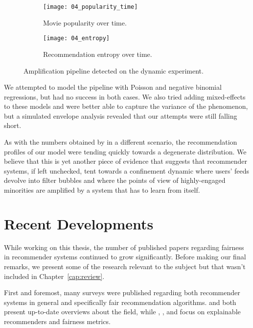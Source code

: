 \begin{figure}
  \centering
  \begin{subfigure}{0.45\textwidth}
    \centering
    \texttt{[image: 04\_popularity\_time]}
    \caption{Movie popularity over time.\label{fig:fig05_popularity_time}}
  \end{subfigure}
  \begin{subfigure}{0.45\textwidth}
    \centering
    \texttt{[image: 04\_entropy]}
    \caption{Recommendation entropy over time.\label{fig:fig05_entropy}}
  \end{subfigure}
  \caption{Amplification pipeline detected on the dynamic
  experiment.\label{fig:fig05_amplification}}
\end{figure}

We attempted to model the pipeline with Poisson and negative binomial
regressions, but had no success in both cases. We also tried adding
mixed-effects to these models and were better able to capture the variance of
the phenomenon, but a simulated envelope analysis revealed that our attempts
were still falling short.

As with the numbers obtained by \citet{jiang_degenerate_2019} in a different
scenario, the recommendation profiles of our model were tending quickly towards
a degenerate distribution. We believe that this is yet another piece of evidence
that suggests that recommender systems, if left unchecked, tent towards a
confinement dynamic where users' feeds devolve into filter bubbles and where the
points of view of highly-engaged minorities are amplified by a system that has
to learn from itself.

\section{Recent Developments}
\label{sec:developments}

While working on this thesis, the number of published papers regarding fairness
in recommender systems continued to grow significantly. Before making our final
remarks, we present some of the research relevant to the subject but that wasn't
included in Chapter~\ref{cap:review}.

First and foremost, many surveys were published regarding both recommender
systems in general and specifically fair recommendation algorithms.
\citet{afsar_reinforcement_2022} and \citet{ko_survey_2022} both present
up-to-date overviews about the field, while \citet{deldjoo_fairness_2022},
\citet{wang_survey_2023}, and \citet{li_fairness_2022} focus on explainable
recommenders and fairness metrics.

